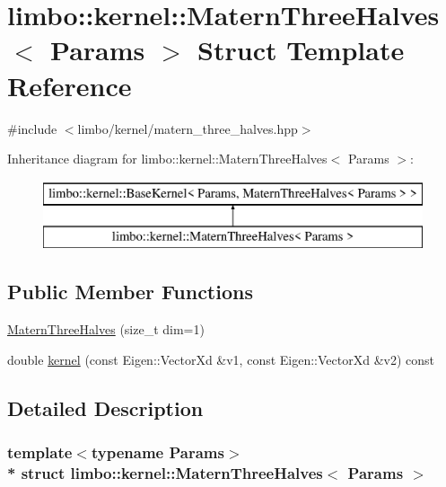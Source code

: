\hypertarget{structlimbo_1_1kernel_1_1_matern_three_halves}{}\section{limbo\+:\+:kernel\+:\+:Matern\+Three\+Halves$<$ Params $>$ Struct Template Reference}
\label{structlimbo_1_1kernel_1_1_matern_three_halves}


{\ttfamily \#include $<$limbo/kernel/matern\+\_\+three\+\_\+halves.\+hpp$>$}

Inheritance diagram for limbo\+:\+:kernel\+:\+:Matern\+Three\+Halves$<$ Params $>$\+:\begin{figure}[H]
\begin{center}
\leavevmode
\includegraphics[height=2.000000cm]{structlimbo_1_1kernel_1_1_matern_three_halves}
\end{center}
\end{figure}
\subsection*{Public Member Functions}
\begin{DoxyCompactItemize}
\item 
\hyperlink{structlimbo_1_1kernel_1_1_matern_three_halves_a676c205ada09d0ef4ba9ea36d68ba9b9}{Matern\+Three\+Halves} (size\+\_\+t dim=1)
\item 
double \hyperlink{structlimbo_1_1kernel_1_1_matern_three_halves_aa94330a95c9e901b371e431ee640dc91}{kernel} (const Eigen\+::\+Vector\+Xd \&v1, const Eigen\+::\+Vector\+Xd \&v2) const 
\end{DoxyCompactItemize}


\subsection{Detailed Description}
\subsubsection*{template$<$typename Params$>$\\*
struct limbo\+::kernel\+::\+Matern\+Three\+Halves$<$ Params $>$}

